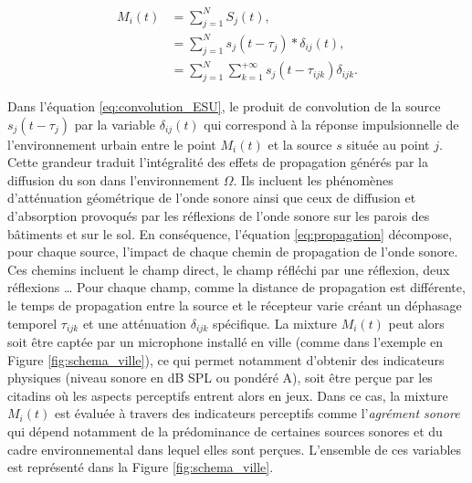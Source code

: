 \begin{subequations}\label{eq:esu_formel}
\begin{align}
M_i(t) &= \sum_{j = 1}^{N}S_j(t), \\
 & = \sum_{j = 1}^{N} s_j(t-\tau_j) \ast \delta_{ij}(t), \label{eq:convolution_ESU}\\
 & = \sum_{j = 1}^{N} \sum_{k = 1}^{+\infty} s_j(t-\tau_{ijk}) \delta_{ijk}.\label{eq:propagation}
\end{align}
\end{subequations}

Dans l'équation \ref{eq:convolution_ESU}, le produit de convolution de la source $s_j(t-\tau_j)$ par la variable $\delta_{ij}(t)$ qui correspond à la réponse impulsionnelle de l'environnement urbain entre le point $M_i(t)$ et la source $s$ située au point $j$. Cette grandeur traduit l'intégralité des effets de propagation générés par la diffusion du son dans l'environnement $\Omega$. Ils incluent les phénomènes d'atténuation géométrique de l'onde sonore ainsi que ceux de diffusion et d'absorption provoqués par les réflexions de l'onde sonore sur les parois des bâtiments et sur le sol.
En conséquence, l'équation \ref{eq:propagation} décompose, pour chaque source, l'impact de chaque chemin de propagation de l'onde sonore. Ces chemins incluent le champ direct, le champ réfléchi par une réflexion, deux réflexions \dots{} Pour chaque champ, comme la distance de propagation est différente, le temps de propagation entre la source et le récepteur varie créant un déphasage temporel $\tau_{ijk}$ et une atténuation $\delta_{ijk}$ spécifique.
La mixture $M_{i}(t)$ peut alors soit être captée par un microphone installé en ville (comme dans l'exemple en Figure \ref{fig:schema_ville}), ce qui permet notamment d'obtenir des indicateurs physiques (niveau sonore en dB SPL ou pondéré A), soit être perçue par les citadins où les aspects perceptifs entrent alors en jeux. Dans ce cas, la mixture $M_{i}(t)$ est évaluée à travers des indicateurs perceptifs comme l'\textit{agrément sonore} qui dépend notamment de la prédominance de certaines sources sonores et du cadre environnemental dans lequel elles sont perçues. L'ensemble de ces variables est représenté dans la Figure \ref{fig:schema_ville}.

